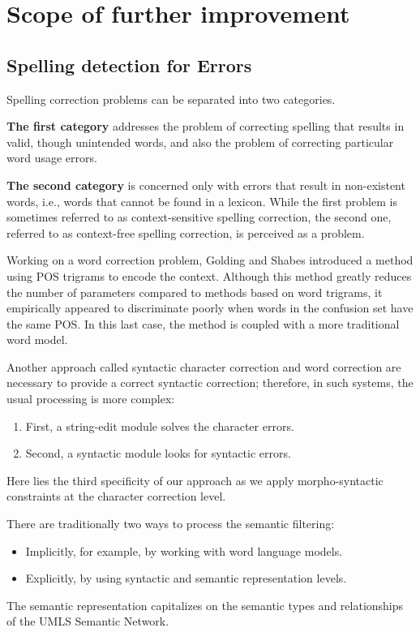 \section{Scope of further improvement}

\subsection{ Spelling detection for Errors}
Spelling correction problems\cite{Ruch2003SpellingCorrectionEPR} can be separated into two categories.

\textbf{The first category} addresses the problem of correcting spelling that results in valid, though unintended words, and also the problem of correcting particular word usage errors.

\textbf{The second category} is concerned only with errors that result in non-existent words, i.e., words that cannot be found in a lexicon. While the first problem is sometimes referred to as context-sensitive spelling correction, the second one, referred to as context-free spelling correction, is perceived as a problem.

Working on a word correction problem, Golding and Shabes introduced a method using POS trigrams to encode the context. Although this method greatly reduces the number of parameters compared to methods based on word trigrams, it empirically appeared to discriminate poorly when words in the confusion set have the same POS. In this last case, the method is coupled with a more traditional word model.

Another approach called syntactic character correction and word correction are necessary to provide a correct syntactic correction; therefore, in such systems, the usual processing is more complex:
\begin{enumerate}
    \item First, a string-edit module solves the character errors.
    \item Second, a syntactic module looks for syntactic errors.
\end{enumerate}
Here lies the third specificity of our approach as we apply morpho-syntactic constraints at the character correction level.

There are traditionally two ways to process the semantic filtering:
\begin{itemize}
    \item Implicitly, for example, by working with word language models.
    \item Explicitly, by using syntactic and semantic representation levels.
\end{itemize}
The semantic representation capitalizes on the semantic types and relationships of the UMLS Semantic Network.


